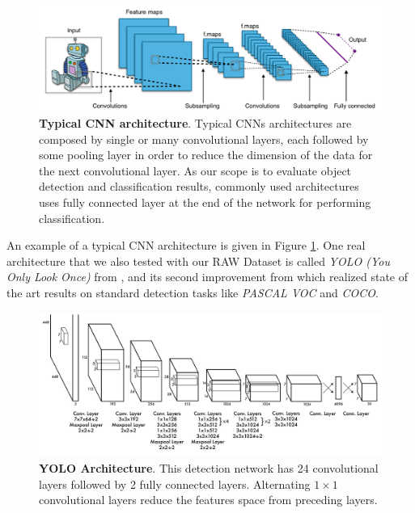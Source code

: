 \begin{figure}
    \centering
    \includegraphics[width=\textwidth]{figures/1_perception_and_sensing_in_robotics/typical_cnn}
    \caption{\textbf{Typical CNN architecture}. Typical CNNs architectures are composed by single or many convolutional layers, each followed by some pooling layer in order to reduce the dimension of the data for the next convolutional layer. As our scope is to evaluate object detection and classification results, commonly used architectures uses fully connected layer at the end of the network for performing classification.} 
    \label{fig:typical_cnn}
\end{figure}

An example of a typical CNN architecture is given in Figure \ref{fig:typical_cnn}. One real architecture that we also tested with our RAW Dataset is called \emph{YOLO (You Only Look Once)} from \cite{Redmon2016YOLO}, and its second improvement from \cite{Redmon2017YOLO2} which realized state of the art results on standard detection tasks like \emph{PASCAL VOC} and \emph{COCO}.

\begin{figure}
    \centering
    \includegraphics[width=\textwidth]{figures/1_perception_and_sensing_in_robotics/yolo_architecture}
    \caption{\textbf{YOLO Architecture}. This detection network has 24 convolutional layers followed by 2 fully connected layers. Alternating $1 \times 1$ convolutional layers reduce the features space from preceding layers.} 
    \label{fig:yolo_architecture}
\end{figure}

